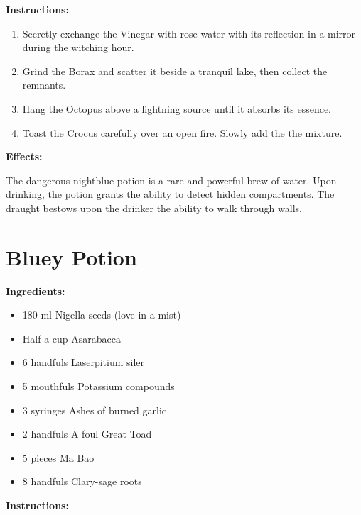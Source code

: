 \documentclass{article}
\begin{document}
\textbf{Instructions:}

\begin{enumerate}
  \item Secretly exchange the Vinegar with rose-water with its reflection in a mirror during the witching hour.
  \item Grind the Borax and scatter it beside a tranquil lake, then collect the remnants.
  \item Hang the Octopus above a lightning source until it absorbs its essence.
  \item Toast the Crocus carefully over an open fire. Slowly add the the mixture.
\end{enumerate}

\textbf{Effects:}

The dangerous nightblue potion is a rare and powerful brew of water. Upon drinking, the potion grants the ability to detect hidden compartments. The draught bestows upon the drinker the ability to walk through walls.

\newpage
\section*{Bluey Potion}

\textbf{Ingredients:}

\begin{itemize}
  \item 180 ml Nigella seeds (love in a mist)
  \item Half a cup Asarabacca
  \item 6 handfuls Laserpitium siler
  \item 5 mouthfuls Potassium compounds
  \item 3 syringes Ashes of burned garlic
  \item 2 handfuls A foul Great Toad
  \item 5 pieces Ma Bao
  \item 8 handfuls Clary-sage roots
\end{itemize}

\textbf{Instructions:}
\end{document}
